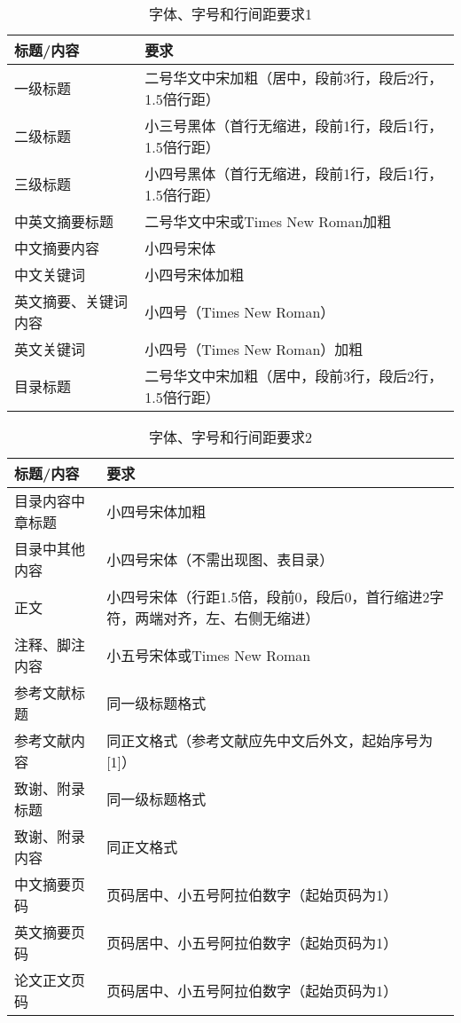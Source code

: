 \begin{table}[htb]
\caption{字体、字号和行间距要求1}
\label{tab:字体、字号和行间距要求1}
\centering
\renewcommand{\arraystretch}{1}
\begin{tabularx}{\linewidth}{LL}
\toprule
\textbf{标题/内容} & \textbf{要求} \\
\midrule
一级标题 & 二号华文中宋加粗（居中，段前3行，段后2行，1.5倍行距） \\
二级标题 & 小三号黑体（首行无缩进，段前1行，段后1行，1.5倍行距） \\
三级标题 & 小四号黑体（首行无缩进，段前1行，段后1行，1.5倍行距） \\
中英文摘要标题 & 二号华文中宋或Times New Roman加粗 \\
中文摘要内容 & 小四号宋体 \\
中文关键词 & 小四号宋体加粗 \\
英文摘要、关键词内容 & 小四号（Times New Roman） \\
英文关键词 & 小四号（Times New Roman）加粗 \\
目录标题 & 二号华文中宋加粗（居中，段前3行，段后2行，1.5倍行距） \\
\bottomrule
\end{tabularx}
\end{table}

\begin{table}[htb]
\caption{字体、字号和行间距要求2}
\label{tab:字体、字号和行间距要求2}
\centering
\renewcommand{\arraystretch}{1}
\begin{tabularx}{\linewidth}{LL}
\toprule
\textbf{标题/内容} & \textbf{要求} \\
\midrule
目录内容中章标题 & 小四号宋体加粗 \\
目录中其他内容 & 小四号宋体（不需出现图、表目录） \\
正文 & 小四号宋体（行距1.5倍，段前0，段后0，首行缩进2字符，两端对齐，左、右侧无缩进） \\
注释、脚注内容 & 小五号宋体或Times New Roman \\
参考文献标题 & 同一级标题格式 \\
参考文献内容 & 同正文格式（参考文献应先中文后外文，起始序号为[1]） \\
致谢、附录标题 & 同一级标题格式 \\
致谢、附录内容 & 同正文格式 \\
中文摘要页码 & 页码居中、小五号阿拉伯数字（起始页码为1） \\
英文摘要页码 & 页码居中、小五号阿拉伯数字（起始页码为1） \\
论文正文页码 & 页码居中、小五号阿拉伯数字（起始页码为1） \\
\bottomrule
\end{tabularx}
\end{table}



